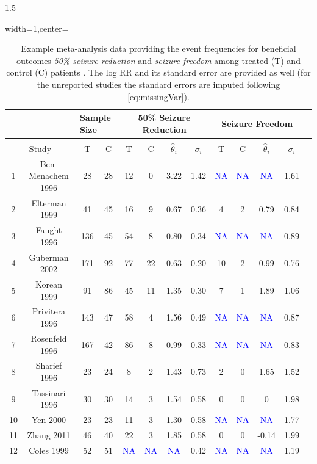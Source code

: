\documentclass{article}
\begin{document}
\begin{spacing}{1.5}
\begin{table}[!h]
\centering
\caption{Example meta-analysis data providing the event frequencies for beneficial outcomes \textit{50\% seizure reduction} and \textit{seizure freedom} among treated (T) and control (C) patients \cite{copas2019model, bresnahan2019topiramate}. The log RR and its standard error are provided as well (for the unreported studies the standard errors are imputed following \eqref{eq:missingVar}).}
\label{tab:data}
\begin{adjustbox}{width=1\textwidth,center=\textwidth}
\begin{tabular}{ccccccccccccc}
\hline
\textbf{} &                   & \multicolumn{2}{l}{Sample Size} & \multicolumn{4}{c}{50\% Seizure Reduction}    & \multicolumn{4}{c}{Seizure Freedom}             \\ \hline \\[-0.4cm] 
\multicolumn{2}{c}{Study}     & T  & C   & T  & C  & $\hat\theta_i$  & $\sigma_i$ & T  & C   & $\hat\theta_i$   & $\sigma_i$ \\ \hline 
1  & Ben-Menachem 1996 & 28  & 28    & 12  & 0  & 3.22   & 1.42  & \textcolor{blue}{NA} & \textcolor{blue}{NA} & \textcolor{blue}{NA} & 1.61       \\2     & Elterman 1999   & 41   & 45  & 16  & 9  & 0.67  & 0.36    & 4   & 2  & 0.79  & 0.84       \\3  & Faught 1996 & 136 & 45  & 54   & 8   & 0.80    & 0.34 & \textcolor{blue}{NA} & \textcolor{blue}{NA} & \textcolor{blue}{NA} & 0.89 \\4  & Guberman 2002   & 171  & 92       & 77  & 22 & 0.63    & 0.20   & 10  & 2   & 0.99    & 0.76 \\5  & Korean 1999 & 91   & 86   & 45    & 11   & 1.35 & 0.30  & 7   & 1   & 1.89  & 1.06       \\6   & Privitera 1996    & 143 & 47  & 58    & 4  & 1.56  & 0.49   & \textcolor{blue}{NA} & \textcolor{blue}{NA} & \textcolor{blue}{NA}& 0.87       \\7  & Rosenfeld 1996 & 167 & 42 & 86  & 8  & 0.99   & 0.33  & \textcolor{blue}{NA} & \textcolor{blue}{NA} & \textcolor{blue}{NA} & 0.83 \\ 8   & Sharief 1996  & 23  & 24  & 8   & 2  & 1.43 & 0.73 & 2  & 0 & 1.65  & 1.52 \\9   & Tassinari 1996    & 30  & 30  & 14  & 3 & 1.54  & 0.58       & 0   & 0  & 0 & 1.98 \\10  & Yen 2000 & 23  & 23 & 11  & 3   & 1.30 & 0.58  & \textcolor{blue}{NA} & \textcolor{blue}{NA} & \textcolor{blue}{NA} & 1.77 \\11 & Zhang 2011  & 46 & 40 & 22    & 3  & 1.85  & 0.58  & 0      & 0  & -0.14 & 1.99 \\12 & Coles 1999        & 52 & 51 & \textcolor{blue}{NA} & \textcolor{blue}{NA} & \textcolor{blue}{NA} & 0.42  & \textcolor{blue}{NA} & \textcolor{blue}{NA} & \textcolor{blue}{NA} & 1.19  \\ \hline 
\end{tabular}
\end{adjustbox}
\end{table}


\end{spacing}
\end{document}
